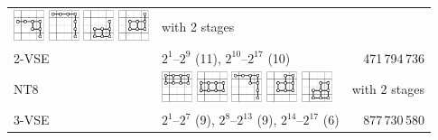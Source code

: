 \documentclass[runningheads]{llncs}
\begin{document}
\begin{tabular}{p{1.2cm}l@{~~}r}
\includegraphics[width=0.9cm]{figures/NTuple-74.pdf}
\includegraphics[width=0.9cm]{figures/NTuple-75.pdf}
\includegraphics[width=0.9cm]{figures/NTuple-76.pdf}
\includegraphics[width=0.9cm]{figures/NTuple-77.pdf}
& with 2 stages \\
2-VSE & \phantom{\rule{1pt}{9.5pt}} $2^1$--$2^{9}$ (11), $2^{10}$--$2^{17}$ (10)   &  471\,794\,736  \\\hline
\textsf{NT8}
&
\includegraphics[width=0.9cm]{figures/NTuple-80.pdf}
\includegraphics[width=0.9cm]{figures/NTuple-81.pdf}
\includegraphics[width=0.9cm]{figures/NTuple-82.pdf}
\includegraphics[width=0.9cm]{figures/NTuple-83.pdf}
\includegraphics[width=0.9cm]{figures/NTuple-84.pdf}
& with 2 stages \\
3-VSE & \phantom{\rule{1pt}{9.5pt}} $2^1$--$2^{7}$ (9), $2^{8}$--$2^{13}$ (9), $2^{14}$--$2^{17}$ (6) & 877\,730\,580 \\\hline

\end{tabular}
\end{document}
